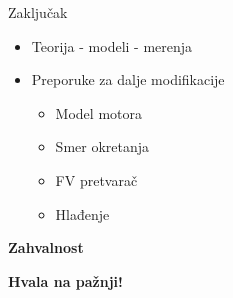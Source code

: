 \documentclass[aspectratio=169,xcolor=dvipsnames]{beamer}
\begin{document}

\begin{frame}{Zaključak}

	\begin{itemize}
		\item Teorija - modeli - merenja
		\item Preporuke za dalje modifikacije
			\begin{itemize}
				\item Model motora
				\item Smer okretanja
				\item FV pretvarač
				\item Hlađenje
			\end{itemize}
		
	\end{itemize}
    
\end{frame}



\begin{frame}

	\Huge{{\centerline{\textbf{Zahvalnost}}}}
    
\end{frame}


\begin{frame}

	\Huge{{\centerline{\textbf{Hvala na pažnji!}}}}
    
\end{frame}




\end{document}
